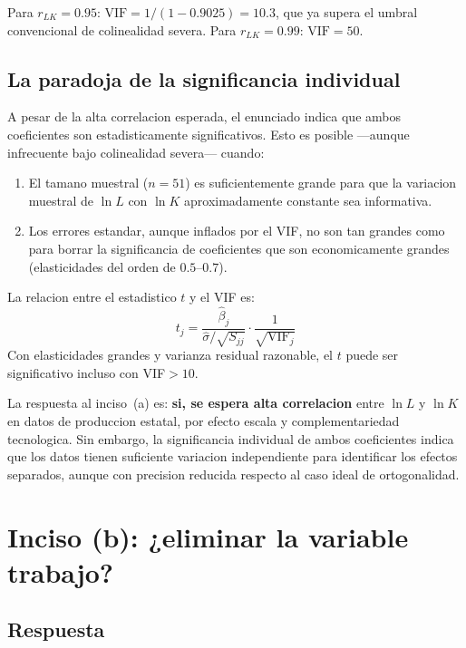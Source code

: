 \documentclass[12pt, letterpaper]{article}
\theoremstyle{remark}
\begin{document}
Para $r_{LK} = 0.95$: $\text{VIF} = 1/(1 - 0.9025) = 10.3$, que ya supera
el umbral convencional de colinealidad severa. Para $r_{LK} = 0.99$:
$\text{VIF} = 50$.

\subsection{La paradoja de la significancia individual}

A pesar de la alta correlacion esperada, el enunciado indica que ambos
coeficientes son estadisticamente significativos. Esto es posible
—aunque infrecuente bajo colinealidad severa— cuando:

\begin{enumerate}[leftmargin=1.8em, itemsep=4pt]
  \item El tamano muestral ($n = 51$) es suficientemente grande para que la
    variacion muestral de $\ln L$ con $\ln K$ aproximadamente constante
    sea informativa.
  \item Los errores estandar, aunque inflados por el VIF, no son tan grandes
    como para borrar la significancia de coeficientes que son economicamente
    grandes (elasticidades del orden de $0.5$--$0.7$).
\end{enumerate}

La relacion entre el estadistico $t$ y el VIF es:
\begin{equation}
  t_j = \frac{\hat\beta_j}{\hat\sigma / \sqrt{S_{jj}}} \cdot \frac{1}{\sqrt{\text{VIF}_j}}
  \label{eq:t_vif}
\end{equation}
Con elasticidades grandes y varianza residual razonable, el $t$ puede ser
significativo incluso con VIF$> 10$.

\begin{clave}
  La respuesta al inciso~(a) es: \textbf{si, se espera alta correlacion} entre
  $\ln L$ y $\ln K$ en datos de produccion estatal, por efecto escala y
  complementariedad tecnologica. Sin embargo, la significancia individual de
  ambos coeficientes indica que los datos tienen suficiente variacion
  independiente para identificar los efectos separados, aunque con precision
  reducida respecto al caso ideal de ortogonalidad.
\end{clave}

\section{Inciso (b): ¿eliminar la variable trabajo?}

\subsection{Respuesta}
\end{document}
